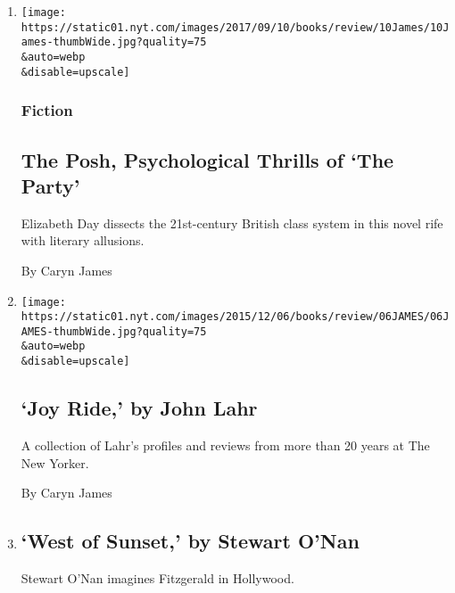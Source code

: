 \begin{enumerate}
\def\labelenumi{\arabic{enumi}.}
\item
  \href{/2017/09/08/books/review/the-party-elizabeth-day.html}{}

  \texttt{[image: https://static01.nyt.com/images/2017/09/10/books/review/10James/10James-thumbWide.jpg?quality=75\\\&auto=webp\\\&disable=upscale]}

  \hypertarget{fiction}{%
  \subsubsection{Fiction}\label{fiction}}

  \hypertarget{the-posh-psychological-thrills-of-the-party}{%
  \subsection{The Posh, Psychological Thrills of `The
  Party'}\label{the-posh-psychological-thrills-of-the-party}}

  Elizabeth Day dissects the 21st-century British class system in this
  novel rife with literary allusions.

  By Caryn James
\item
  \href{/2015/12/06/books/review/joy-ride-by-john-lahr.html}{}

  \texttt{[image: https://static01.nyt.com/images/2015/12/06/books/review/06JAMES/06JAMES-thumbWide.jpg?quality=75\\\&auto=webp\\\&disable=upscale]}

  \hypertarget{joy-ride-by-john-lahr}{%
  \subsection{`Joy Ride,' by John Lahr}\label{joy-ride-by-john-lahr}}

  A collection of Lahr's profiles and reviews from more than 20 years at
  The New Yorker.

  By Caryn James
\item
  \href{/2015/02/22/books/review/west-of-sunset-by-stewart-onan.html}{}

  \hypertarget{west-of-sunset-by-stewart-onan}{%
  \subsection{`West of Sunset,' by Stewart
  O'Nan}\label{west-of-sunset-by-stewart-onan}}

  Stewart O'Nan imagines Fitzgerald in Hollywood.


\end{enumerate}
